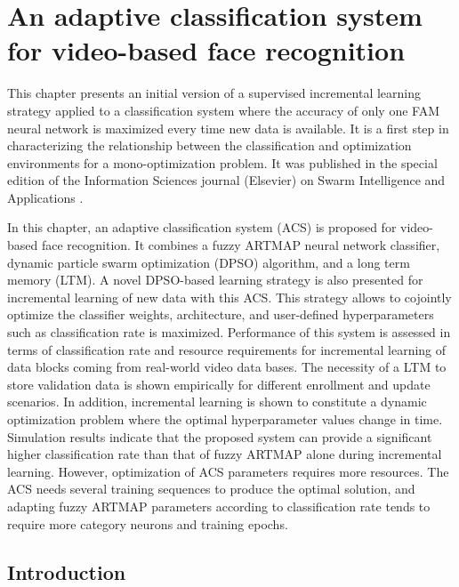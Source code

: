 \chapter{An adaptive classification system for video-based face recognition}

This chapter presents an initial version of a supervised incremental learning strategy applied to a classification system where the accuracy of only one FAM neural network is maximized every time new data is available.
It is a first step in characterizing the relationship between the classification and optimization environments for a mono-optimization problem.
It was published in the special edition of the Information Sciences journal (Elsevier) on Swarm Intelligence and Applications \cite{connolly10}. 

In this chapter, an adaptive classification system (ACS) is proposed for video-based face recognition. It combines a fuzzy ARTMAP neural network classifier, dynamic particle swarm optimization (DPSO) algorithm, and a long term memory (LTM). A novel DPSO-based learning strategy is also presented for incremental learning of new data with this ACS. This strategy allows to cojointly optimize the classifier weights, architecture, and user-defined hyperparameters such as classification rate is maximized. Performance of this system is assessed in terms of classification rate and resource requirements for incremental learning of data blocks coming from real-world video data bases. The necessity of a LTM to store validation data is shown empirically for different enrollment and update scenarios. In addition, incremental learning is shown to constitute a dynamic optimization problem where the optimal hyperparameter values change in time. Simulation results indicate that the proposed system can provide a significant higher classification rate than that of fuzzy ARTMAP alone during incremental learning. However, optimization of ACS parameters requires more resources. The ACS needs several training sequences to produce the optimal solution, and adapting fuzzy ARTMAP parameters according to classification rate tends to require more category neurons and training epochs.

\section{Introduction}

